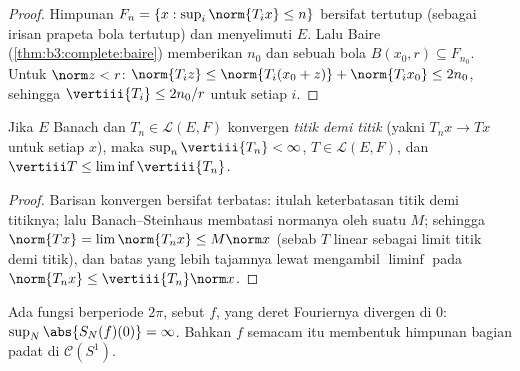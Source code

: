 \begin{proof}
Himpunan $F_n = \{x : \sup_i\norm{T_ix} \leq n\}$ bersifat tertutup
(sebagai irisan prapeta bola tertutup) dan menyelimuti $E$.
Lalu Baire (\cref{thm:b3:complete:baire}) memberikan $n_0$ dan sebuah bola
$B(x_0, r) \subseteq F_{n_0}$. Untuk $\norm z < r$: $\norm{T_iz}
\leq \norm{T_i(x_0 + z)} + \norm{T_ix_0} \leq 2n_0$, sehingga
$\vertiii{T_i} \leq 2n_0/r$ untuk setiap $i$.
\end{proof}

\begin{corollary}\label{cor:b3:banach:bslimits}
Jika $E$ Banach dan $T_n \in \mathcal L(E,F)$ konvergen
\emph{titik demi titik} (yakni $T_nx \to Tx$ untuk setiap $x$), maka $\sup_n
\vertiii{T_n} < \infty$, $T \in \mathcal L(E, F)$, dan
$\vertiii T \leq \liminf \vertiii{T_n}$.
\end{corollary}

\begin{proof}
Barisan konvergen bersifat terbatas: itulah keterbatasan titik demi titiknya;
lalu Banach--Steinhaus membatasi normanya oleh suatu $M$; sehingga $\norm{Tx}
= \lim\norm{T_nx} \leq M\norm x$ (sebab $T$ linear sebagai limit titik demi
titik), dan batas yang lebih tajamnya lewat mengambil $\liminf$ pada
$\norm{T_nx} \leq \vertiii{T_n}\norm x$.
\end{proof}

\begin{theorem}
\label{thm:b3:banach:fourierdiverge}
Ada fungsi  berperiode $2\pi$, sebut $f$, yang
deret Fouriernya divergen di $0$: $\sup_N\abs{S_N(f)(0)} =
\infty$. Bahkan $f$ semacam itu membentuk himpunan bagian padat di $\mathcal
C(S^1)$.
\end{theorem}

